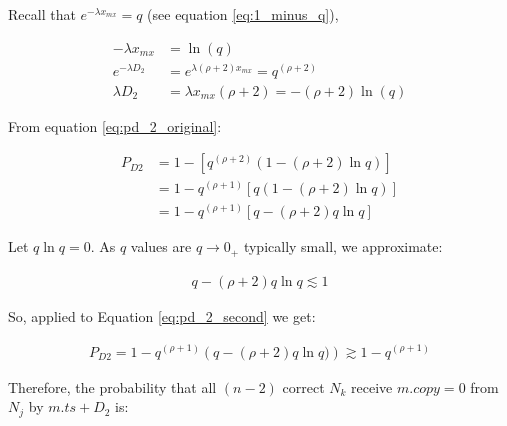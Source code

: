         Recall that $e^{-\lambda x_{mx}} = q$ (see equation \ref{eq:1_minus_q}),
        
        \begin{equation}
        \begin{split}
               -\lambda x_{mx} &= \ln(q) \\
               e^{-\lambda D_2} &= e^{\lambda (\rho + 2) x_{mx}} = q^{(\rho+2)} \\
               \lambda D_2 &= \lambda x_{mx} (\rho + 2) = - (\rho + 2) \ln(q)
        \end{split}
    \end{equation}
            
    From equation \ref{eq:pd_2_original}:
    
    \begin{equation}
        \label{eq:pd_2_second}
        \begin{split}
                P_{D2} &= 1 - \left[ q ^{(\rho + 2)} \left( 1 - (\rho + 2) \ln q \right)   \right] \\
                           &=  1 - q^{(\rho + 1)} \left[ q \left( 1 - (\rho + 2) \ln q  \right) \right] \\
                           &= 1- q^{(\rho + 1)} \left[ q - (\rho + 2) q \ln q \right]
        \end{split}
    \end{equation}
    
    Let $q \ln q = 0$.  As $q$ values are $q \rightarrow 0_+$ typically small, we approximate:
    
    \begin{equation}
        \begin{aligned}
                q - (\rho + 2) q \ln q \lesssim 1
            \end{aligned}
        \end{equation}
    
    So, applied to Equation \ref{eq:pd_2_second} we get:
    
    \begin{equation}
        \begin{aligned}
                P_{D2} = 1 - q^{(\rho+1)} \left( q - (\rho + 2) q \ln q)    \right) \gtrsim 1 - q^{(\rho + 1)}
            \end{aligned}
        \end{equation}
        
        Therefore, the probability that all $(n-2)$ correct $N_k$ receive $m.copy = 0$ from $N_j$ by $m.ts + D_2$ is:
        

